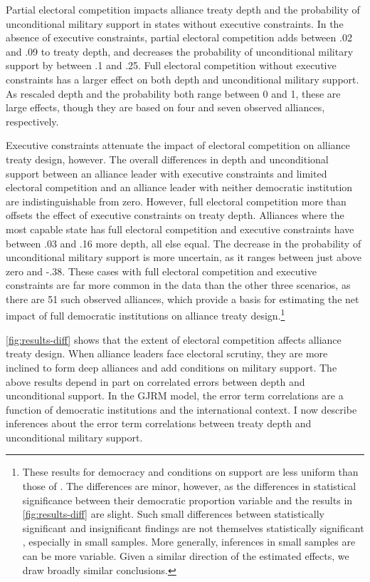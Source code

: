 \documentclass[12pt]{article}
\begin{document}
Partial electoral competition impacts alliance treaty depth and the probability of unconditional military support in states without executive constraints. 
In the absence of executive constraints, partial electoral competition adds between .02 and .09 to treaty depth, and decreases the probability of unconditional military support by between .1 and .25.
Full electoral competition without executive constraints has a larger effect on both depth and unconditional military support. 
As rescaled depth and the probability both range between 0 and 1, these are large effects, though they are based on four and seven observed alliances, respectively. 


Executive constraints attenuate the impact of electoral competition on alliance treaty design, however. 
The overall differences in depth and unconditional support between an alliance leader with executive constraints and limited electoral competition and an alliance leader with neither democratic institution are indistinguishable from zero. 
However, full electoral competition more than offsets the effect of executive constraints on treaty depth.
Alliances where the most capable state has full electoral competition and executive constraints have between .03 and .16 more depth, all else equal. 
The decrease in the probability of unconditional military support is more uncertain, as it ranges between just above zero and -.38. 
These cases with full electoral competition and executive constraints are far more common in the data than the other three scenarios, as there are 51 such observed alliances, which provide a basis for estimating the net impact of full democratic institutions on alliance treaty design.\footnote{These results for democracy and conditions on support are less uniform than those of \citet{Chibaetal2015}. 
The differences are minor, however, as the differences in statistical significance between their democratic proportion variable and the results in \autoref{fig:results-diff} are slight. 
Such small differences between statistically significant and insignificant findings are not themselves statistically significant \citep{GelmanStern2006}, especially in small samples. 
More generally, inferences in small samples are can be more variable.
Given a similar direction of the estimated effects, we draw broadly similar conclusions.}


\autoref{fig:results-diff} shows that the extent of electoral competition affects alliance treaty design.
When alliance leaders face electoral scrutiny, they are more inclined to form deep alliances and add conditions on military support. 
The above results depend in part on correlated errors between depth and unconditional support. 
In the GJRM model, the error term correlations are a function of democratic institutions and the international context. 
I now describe inferences about the error term correlations between treaty depth and unconditional military support. 
\end{document}
